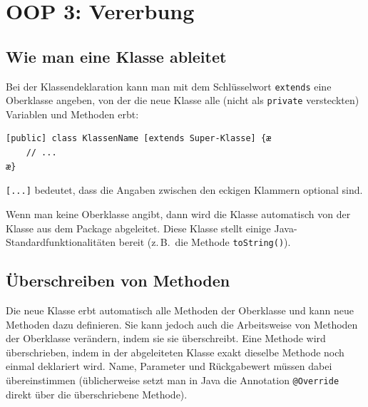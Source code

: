 \chapter{OOP 3: Vererbung}
\renewcommand{\chaptertitle}{OOP 3: Vererbung}

\lehead[]{\normalfont\sffamily\hspace*{-2.00cm}\textcolor{white}{\colorbox{lightblue}{\makebox[1.60cm][r]{\thechapter}}}\hspace{0.17cm}\textcolor{lightblue}{\chaptertitle}}
\rohead[]{\textcolor{lightblue}{\chaptertitle}\normalfont\sffamily\hspace*{0.17cm}\textcolor{white}{\colorbox{lightblue}{\makebox[1.60cm][l]{\thechapter}}}\hspace{-2.00cm}}
\rehead[]{\textcolor{lightblue}{AvHG, Inf, My}}
\lohead[]{\textcolor{lightblue}{AvHG, Inf, My}}

\lstset{style=myJava}

\section{Wie man eine Klasse ableitet}

Bei der Klassendeklaration kann man mit dem Schlüsselwort \lstinline|extends| eine
Oberklasse angeben, von der die neue Klasse alle (nicht als \lstinline|private|
versteckten) Variablen und Methoden erbt:

\begin{minipage}{0.65\textwidth}
\begin{lstlisting}
[public] class KlassenName [extends Super-Klasse] {æ
    // ...
æ}
\end{lstlisting}
\end{minipage}
\hfill
\begin{minipage}{0.25\textwidth}
\lstinline|[...]| bedeutet, dass die Angaben zwischen den eckigen
Klammern optional sind.
\end{minipage}

Wenn man keine Oberklasse angibt, dann wird die Klasse automatisch von der
Klasse  aus dem Package  abgeleitet. Diese
Klasse stellt einige Java-Standardfunktionalitäten bereit (z.\,B.\ die Methode
\lstinline|toString()|).


\section{Überschreiben von Methoden}

Die neue Klasse erbt automatisch alle Methoden der Oberklasse und kann neue
Methoden dazu definieren. Sie kann jedoch auch die Arbeitsweise von Methoden der
Oberklasse verändern, indem sie sie überschreibt. Eine Methode wird
überschrieben, indem in der abgeleiteten Klasse exakt dieselbe Methode noch
einmal deklariert wird. Name, Parameter und Rückgabewert müssen dabei
übereinstimmen (üblicherweise setzt man in Java die Annotation
\lstinline|@Override| direkt über die überschriebene Methode).

